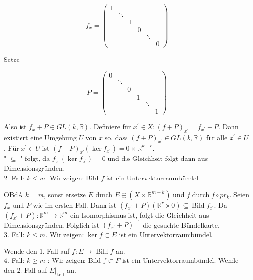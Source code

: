 $$
f_{x}=\left(\begin{array}{cccccc}
1 & & & & & \\
& \ddots & & & & \\
& & 1 & & & \\
& & & 0 & & \\
& & & & \ddots & \\
& & & & & 0
\end{array}\right)
$$

Setze

$$
P=\left(\begin{array}{cccccc}
0 & & & & & \\
& \ddots & & & & \\
& & 0 & & & \\
& & & 1 & & \\
& & & & \ddots & \\
& & & & & 1
\end{array}\right)
$$

Also ist $f_{x}+P \in G L(k, \mathbb{R})$. Definiere für $x^{\prime} \in X:(f+P)_{x^{\prime}}=f_{x^{\prime}}+P$. Dann existiert eine Umgebung $U$ von $x$ so, dass $(f+P)_{x^{\prime}} \in G L(k, \mathbb{R})$ für alle $x^{\prime} \in U$. Für $x^{\prime} \in U$ ist $(f+P)_{x^{\prime}}\left(\operatorname{ker} f_{x^{\prime}}\right)=0 \times \mathbb{R}^{k-r}$.\\
" $\subseteq$ " folgt, da $f_{x^{\prime}}\left(\operatorname{ker} f_{x^{\prime}}\right)=0$ und die Gleichheit folgt dann aus Dimensionsgründen.\\
2. Fall: $k \leq m$. Wir zeigen: Bild $f$ ist ein Untervektorraumbündel.

OBdA $k=m$, sonst ersetze $E$ durch $E \oplus\left(X \times \mathbb{R}^{m-k}\right)$ und $f$ durch $f \circ p r_{k}$. Seien $f_{x}$ und $P$ wie im ersten Fall. Dann ist $\left(f_{x^{\prime}}+P\right)\left(\mathbb{R}^{r} \times 0\right) \subseteq \operatorname{Bild} f_{x^{\prime}}$. Da $\left(f_{x^{\prime}}+P\right): \mathbb{R}^{m} \rightarrow \mathbb{R}^{m}$ ein Isomorphismus ist, folgt die Gleichheit aus Dimensionsgründen. Folglich ist $\left(f_{x^{\prime}}+P\right)^{-1}$ die gesuchte Bündelkarte.\\
3. Fall: $k \leq m$. Wir zeigen: $\operatorname{ker} f \subset E$ ist ein Untervektorraumbündel.

Wende den 1. Fall auf $f: E \rightarrow \operatorname{Bild} f$ an.\\
4. Fall: $k \geq m$ : Wir zeigen: Bild $f \subset F$ ist ein Untervektorraumbündel. Wende den 2. Fall auf $\left.E\right|_{\operatorname{kerf}}$ an.

